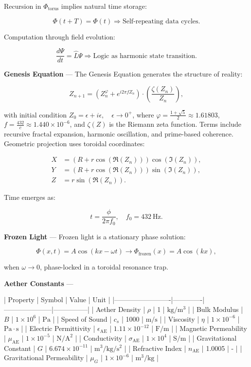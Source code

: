 Recursion in $\Phi_{\text{torus}}$ implies natural time storage:

$$
\Phi(t + T) = \Phi(t) \Rightarrow \text{Self-repeating data cycles}.
$$

Computation through field evolution:

$$
\frac{d \Psi}{d t} = \hat{L} \Psi \Rightarrow \text{Logic as harmonic state transition}.
$$

\textbf{Genesis Equation} --- The Genesis Equation generates the structure of reality:

$$
Z_{n+1} = \left( Z_n^{\varphi} + e^{i 2 \pi f Z_n} \right) \cdot \left( \frac{\zeta(Z_n)}{Z_n} \right),
$$

with initial condition $Z_0 = \epsilon + i \epsilon, \quad \epsilon \rightarrow 0^{+}$, where $\varphi = \frac{1 + \sqrt{5}}{2} \approx 1.61803$, $f = \frac{432}{c} \approx 1.440 \times 10^{-6}$, and $\zeta(Z)$ is the Riemann zeta function. Terms include recursive fractal expansion, harmonic oscillation, and prime-based coherence. Geometric projection uses toroidal coordinates:

$$
\begin{aligned}
X &= \left( R + r \cos \left( \Re(Z_n) \right) \right) \cos \left( \Im(Z_n) \right), \\
Y &= \left( R + r \cos \left( \Re(Z_n) \right) \right) \sin \left( \Im(Z_n) \right), \\
Z &= r \sin \left( \Re(Z_n) \right).
\end{aligned}
$$

Time emerges as:

$$
t = \frac{\phi}{2 \pi f_0}, \quad f_0 = 432 \mathrm{~Hz}.
$$

\textbf{Frozen Light} --- Frozen light is a stationary phase solution:

$$
\Phi(x, t) = A \cos (k x - \omega t) \rightarrow \Phi_{\text{frozen}}(x) = A \cos (k x),
$$

when $\omega \rightarrow 0$, phase-locked in a toroidal resonance trap.

\textbf{Aether Constants} ---

| Property                | Symbol      | Value               | Unit          |
|-------------------------|-------------|---------------------|---------------|
| Aether Density          | $\rho$      | 1                   | $\mathrm{kg/m^3}$ |
| Bulk Modulus            | $B$         | $1 \times 10^6$     | $\mathrm{Pa}$ |
| Speed of Sound          | $c_s$       | 1000                | $\mathrm{m/s}$ |
| Viscosity               | $\eta$      | $1 \times 10^{-6}$  | $\mathrm{Pa \cdot s}$ |
| Electric Permittivity   | $\epsilon_{\mathrm{AE}}$ | $1.11 \times 10^{-12}$ | $\mathrm{F/m}$ |
| Magnetic Permeability   | $\mu_{\mathrm{AE}}$ | $1 \times 10^{-5}$  | $\mathrm{N/A^2}$ |
| Conductivity            | $\sigma_{\mathrm{AE}}$ | $1 \times 10^4$ | $\mathrm{S/m}$ |
| Gravitational Constant  | $G$         | $6.674 \times 10^{-11}$ | $\mathrm{m^3/kg/s^2}$ |
| Refractive Index        | $n_{\mathrm{AE}}$ | 1.0005          | -             |
| Gravitational Permeability | $\mu_G$  | $1 \times 10^{-6}$  | $\mathrm{m^3/kg}$ |

